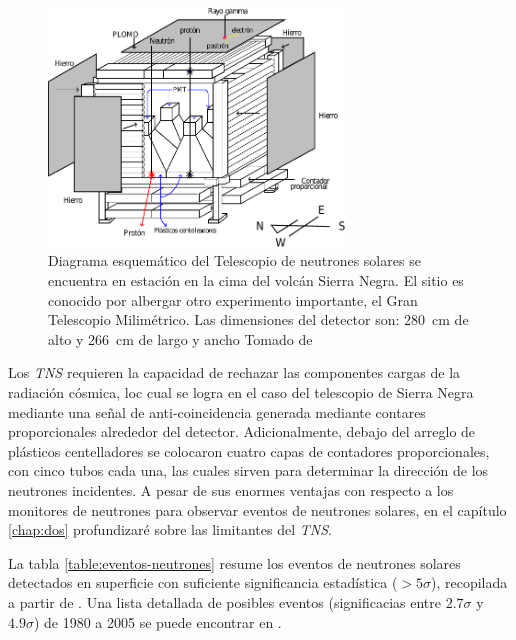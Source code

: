 \begin{figure}
        \centering
        \includegraphics[width=0.7\textwidth]{tns-mexico.pdf}
        \caption{Diagrama esquemático del Telescopio de neutrones solares se encuentra en estación en la cima del volcán Sierra Negra. El sitio es conocido por albergar otro experimento importante, el Gran Telescopio Milimétrico. Las dimensiones del detector son: \SI{280}{\centi\metre} de alto y \SI{266}{\centi\metre} de largo y ancho Tomado de \cite{barrantes18}}
        \label{fig:tns-mexico}
\end{figure}

Los \emph{TNS} requieren la capacidad de rechazar las componentes cargas de la radiación cósmica, loc cual se logra en el caso del telescopio de Sierra Negra mediante una señal de anti-coincidencia generada mediante contares proporcionales alrededor del detector. Adicionalmente, debajo del arreglo de plásticos centelladores se colocaron cuatro capas de contadores proporcionales, con cinco tubos cada una, las cuales sirven para determinar la dirección de los neutrones incidentes. A pesar de sus enormes ventajas con respecto a los monitores de neutrones para observar eventos de neutrones solares, en el capítulo \ref{chap:dos} profundizaré sobre las limitantes del \emph{TNS}.

La tabla \ref{table:eventos-neutrones} resume los eventos de neutrones solares detectados en superficie con suficiente significancia estadística ($>5\sigma$), recopilada a partir de \cite{watanabe05,sako06,muraki16}. Una lista detallada de posibles eventos (significacias entre $2.7\sigma$ y $4.9\sigma$) de \num{1980} a \num{2005} se puede encontrar en \cite{mirosh15}.

